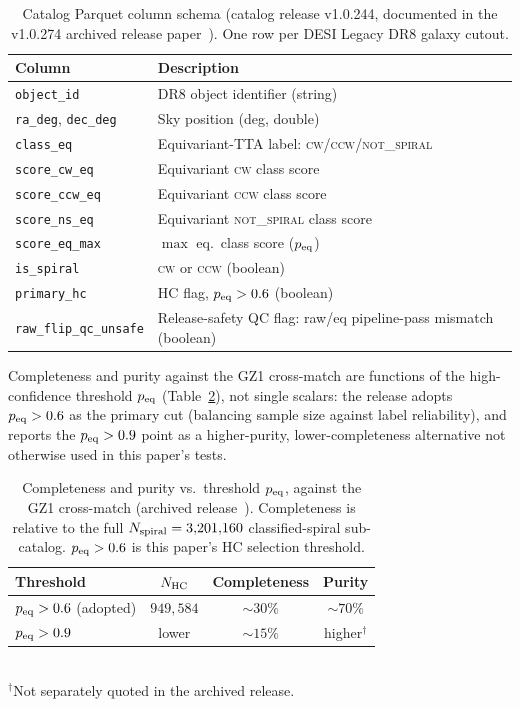 \documentclass[twocolumn,linenumbers]{aastex702}
\newcommand{\CW}{\textsc{cw}}
\newcommand{\CCW}{\textsc{ccw}}
\newcommand{\NS}{\textsc{not\_spiral}}
\begin{document}
\begin{table}[t]
\caption{Catalog Parquet column schema (catalog release v1.0.244, documented in the v1.0.274 archived release paper~\cite{Golden:P4v274}). One row per
DESI Legacy DR8 galaxy cutout.
\label{tab:schema}}
\scriptsize
\begin{tabular}{@{}lp{}@{}}
\toprule
Column & Description \\
\midrule
\texttt{object\_id} & DR8 object identifier (string) \\
\texttt{ra\_deg}, \texttt{dec\_deg} & Sky position (deg, double) \\
\texttt{class\_eq} & Equivariant-TTA label: \CW/\CCW/\NS \\
\texttt{score\_cw\_eq} & Equivariant \CW{} class score \\
\texttt{score\_ccw\_eq} & Equivariant \CCW{} class score \\
\texttt{score\_ns\_eq} & Equivariant \NS{} class score \\
\texttt{score\_eq\_max} & $\max$ eq.\ class score ($p_{\rm eq}$) \\
\texttt{is\_spiral} & \CW{} or \CCW{} (boolean) \\
\texttt{primary\_hc} & HC flag, $p_{\rm eq}>0.6$ (boolean) \\
\texttt{raw\_flip\_qc\_unsafe} & Release-safety QC flag: raw/eq pipeline-pass mismatch (boolean) \\
\bottomrule
\end{tabular}
\end{table}

Completeness and purity against the GZ1 cross-match are functions of the
high-confidence threshold $p_{\rm eq}$ (Table~\ref{tab:completeness}), not
single scalars: the release adopts $p_{\rm eq}>0.6$ as the primary cut
(balancing sample size against label reliability), and reports the
$p_{\rm eq}>0.9$ point as a higher-purity, lower-completeness alternative
not otherwise used in this paper's tests.

\begin{table}[t]
\caption{Completeness and purity vs.\ threshold $p_{\rm eq}$, against the
GZ1 cross-match (archived release~\cite{Golden:P4v274}). Completeness is
relative to the full $N_{\rm spiral}=3{,}201{,}160$ classified-spiral
sub-catalog. $p_{\rm eq}>0.6$ is this paper's HC selection threshold.
\label{tab:completeness}}
\footnotesize
\begin{tabular}{lccc}
\toprule
Threshold & $N_{\rm HC}$ & Completeness & Purity \\
\midrule
$p_{\rm eq}>0.6$ (adopted) & $949{,}584$ & $\sim\!30\%$ & $\sim\!70\%$ \\
$p_{\rm eq}>0.9$ & lower & $\sim\!15\%$ & higher$^{\dagger}$ \\
\bottomrule
\end{tabular}
\\[2pt]
{\scriptsize $^{\dagger}$Not separately quoted in the archived release.}
\end{table}
\end{document}
